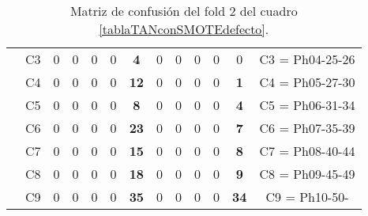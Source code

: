 \begin{table}[H]
{\begin{tabular}{|ccrrrrrrrrrrc|}
\multicolumn{1}{|c|}{}                                      & \multicolumn{1}{c|}{C3} & \multicolumn{1}{c|}{0}  & \multicolumn{1}{c|}{0}  & \multicolumn{1}{c|}{0}  & \multicolumn{1}{c|}{0}  & \multicolumn{1}{c|}{\textbf{4}}  & \multicolumn{1}{c|}{0}  & \multicolumn{1}{c|}{0}  & \multicolumn{1}{c|}{0}  & \multicolumn{1}{c|}{0}  & \multicolumn{1}{c|}{0}  & C3 = Ph04-25-26   \\ \cline{2-13}
\multicolumn{1}{|c|}{}                                      & \multicolumn{1}{c|}{C4} & \multicolumn{1}{c|}{0}  & \multicolumn{1}{c|}{0}  & \multicolumn{1}{c|}{0}  & \multicolumn{1}{c|}{0}  & \multicolumn{1}{c|}{\textbf{12}} & \multicolumn{1}{c|}{0}  & \multicolumn{1}{c|}{0}  & \multicolumn{1}{c|}{0}  & \multicolumn{1}{c|}{0}  & \multicolumn{1}{c|}{\textbf{1}}  & C4 = Ph05-27-30   \\ \cline{2-13}
\multicolumn{1}{|c|}{}                                      & \multicolumn{1}{c|}{C5} & \multicolumn{1}{c|}{0}  & \multicolumn{1}{c|}{0}  & \multicolumn{1}{c|}{0}  & \multicolumn{1}{c|}{0}  & \multicolumn{1}{c|}{\textbf{8}}  & \multicolumn{1}{c|}{0}  & \multicolumn{1}{c|}{0}  & \multicolumn{1}{c|}{0}  & \multicolumn{1}{c|}{0}  & \multicolumn{1}{c|}{\textbf{4}}  & C5 = Ph06-31-34   \\ \cline{2-13}
\multicolumn{1}{|c|}{}                                      & \multicolumn{1}{c|}{C6} & \multicolumn{1}{c|}{0}  & \multicolumn{1}{c|}{0}  & \multicolumn{1}{c|}{0}  & \multicolumn{1}{c|}{0}  & \multicolumn{1}{c|}{\textbf{23}} & \multicolumn{1}{c|}{0}  & \multicolumn{1}{c|}{0}  & \multicolumn{1}{c|}{0}  & \multicolumn{1}{c|}{0}  & \multicolumn{1}{c|}{\textbf{7}}  & C6 = Ph07-35-39   \\ \cline{2-13}
\multicolumn{1}{|c|}{}                                      & \multicolumn{1}{c|}{C7} & \multicolumn{1}{c|}{0}  & \multicolumn{1}{c|}{0}  & \multicolumn{1}{c|}{0}  & \multicolumn{1}{c|}{0}  & \multicolumn{1}{c|}{\textbf{15}} & \multicolumn{1}{c|}{0}  & \multicolumn{1}{c|}{0}  & \multicolumn{1}{c|}{0}  & \multicolumn{1}{c|}{0}  & \multicolumn{1}{c|}{\textbf{8}}  & C7 = Ph08-40-44   \\ \cline{2-13}
\multicolumn{1}{|c|}{}                                      & \multicolumn{1}{c|}{C8} & \multicolumn{1}{c|}{0}  & \multicolumn{1}{c|}{0}  & \multicolumn{1}{c|}{0}  & \multicolumn{1}{c|}{0}  & \multicolumn{1}{c|}{\textbf{18}} & \multicolumn{1}{c|}{0}  & \multicolumn{1}{c|}{0}  & \multicolumn{1}{c|}{0}  & \multicolumn{1}{c|}{0}  & \multicolumn{1}{c|}{\textbf{9}}  & C8 = Ph09-45-49   \\ \cline{2-13}
\multicolumn{1}{|c|}{}                                      & \multicolumn{1}{c|}{C9} & \multicolumn{1}{c|}{0}  & \multicolumn{1}{c|}{0}  & \multicolumn{1}{c|}{0}  & \multicolumn{1}{c|}{0}  & \multicolumn{1}{c|}{\textbf{35}} & \multicolumn{1}{c|}{0}  & \multicolumn{1}{c|}{0}  & \multicolumn{1}{c|}{0}  & \multicolumn{1}{c|}{0}  & \multicolumn{1}{c|}{\textbf{34}} & C9 = Ph10-50-     \\ \hline
\end{tabular}%
}
\caption{Matriz de confusión del fold 2 del cuadro \ref{tablaTANconSMOTEdefecto}.}
\end{table}


